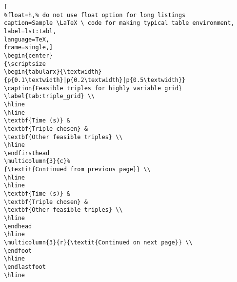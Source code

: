 \begin{lstlisting}[
%float=h,% do not use float option for long listings
caption=Sample \LaTeX \ code for making typical table environment, 
label=lst:tabl,
language=TeX,
frame=single,]
\begin{center}
{\scriptsize
\begin{tabularx}{\textwidth}{p{0.1\textwidth}|p{0.2\textwidth}|p{0.5\textwidth}}
\caption{Feasible triples for highly variable grid} \label{tab:triple_grid} \\
\hline 
\hline 
\textbf{Time (s)} & 
\textbf{Triple chosen} & 
\textbf{Other feasible triples} \\ 
\hline 
\endfirsthead
\multicolumn{3}{c}%
{\textit{Continued from previous page}} \\
\hline
\hline 
\textbf{Time (s)} & 
\textbf{Triple chosen} & 
\textbf{Other feasible triples} \\ 
\hline 
\endhead
\hline 
\multicolumn{3}{r}{\textit{Continued on next page}} \\ 
\endfoot
\hline 
\endlastfoot
\hline


\end{lstlisting}

